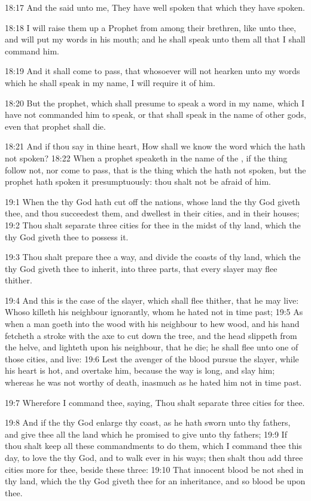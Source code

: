 18:17 And the \LORD said unto me, They have well spoken that which they have spoken.

18:18 I will raise them up a Prophet from among their brethren, like unto thee, and will put my words in his mouth; and he shall speak unto them all that I shall command him.

18:19 And it shall come to pass, that whosoever will not hearken unto my words which he shall speak in my name, I will require it of him.

18:20 But the prophet, which shall presume to speak a word in my name, which I have not commanded him to speak, or that shall speak in the name of other gods, even that prophet shall die.

18:21 And if thou say in thine heart, How shall we know the word which the \LORD hath not spoken?  18:22 When a prophet speaketh in the name of the \LORD, if the thing follow not, nor come to pass, that is the thing which the \LORD hath not spoken, but the prophet hath spoken it presumptuously: thou shalt not be afraid of him.

19:1 When the \LORD thy God hath cut off the nations, whose land the \LORD thy God giveth thee, and thou succeedest them, and dwellest in their cities, and in their houses; 19:2 Thou shalt separate three cities for thee in the midst of thy land, which the \LORD thy God giveth thee to possess it.

19:3 Thou shalt prepare thee a way, and divide the coasts of thy land, which the \LORD thy God giveth thee to inherit, into three parts, that every slayer may flee thither.

19:4 And this is the case of the slayer, which shall flee thither, that he may live: Whoso killeth his neighbour ignorantly, whom he hated not in time past; 19:5 As when a man goeth into the wood with his neighbour to hew wood, and his hand fetcheth a stroke with the axe to cut down the tree, and the head slippeth from the helve, and lighteth upon his neighbour, that he die; he shall flee unto one of those cities, and live: 19:6 Lest the avenger of the blood pursue the slayer, while his heart is hot, and overtake him, because the way is long, and slay him; whereas he was not worthy of death, inasmuch as he hated him not in time past.

19:7 Wherefore I command thee, saying, Thou shalt separate three cities for thee.

19:8 And if the \LORD thy God enlarge thy coast, as he hath sworn unto thy fathers, and give thee all the land which he promised to give unto thy fathers; 19:9 If thou shalt keep all these commandments to do them, which I command thee this day, to love the \LORD thy God, and to walk ever in his ways; then shalt thou add three cities more for thee, beside these three: 19:10 That innocent blood be not shed in thy land, which the \LORD thy God giveth thee for an inheritance, and so blood be upon thee.

